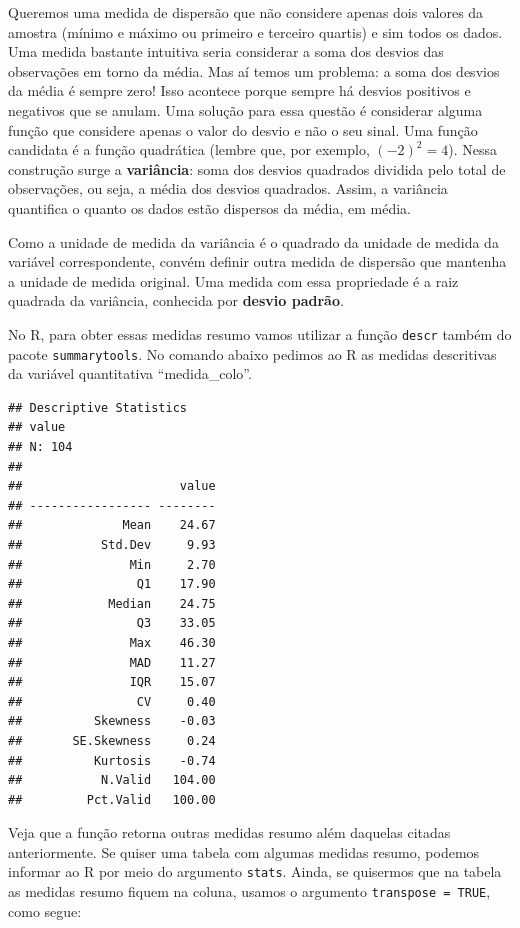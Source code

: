 \documentclass[
]{book}
\newenvironment{Shaded}{\begin{snugshade}}{\end{snugshade}}
\newcommand{\KeywordTok}[1]{\textcolor[rgb]{0.13,0.29,0.53}{\textbf{#1}}}
\newcommand{\NormalTok}[1]{#1}
\newcommand{\OperatorTok}[1]{\textcolor[rgb]{0.81,0.36,0.00}{\textbf{#1}}}
\begin{document}
Queremos uma medida de dispersão que não considere apenas dois valores da amostra (mínimo e máximo ou primeiro e terceiro quartis) e sim todos os dados. Uma medida bastante intuitiva seria considerar a soma dos desvios das observações em torno da média. Mas aí temos um problema: a soma dos desvios da média é sempre zero! Isso acontece porque sempre há desvios positivos e negativos que se anulam. Uma solução para essa questão é considerar alguma função que considere apenas o valor do desvio e não o seu sinal. Uma função candidata é a função quadrática (lembre que, por exemplo, \((-2)^2=4\)). Nessa construção surge a \textbf{variância}: soma dos desvios quadrados dividida pelo total de observações, ou seja, a média dos desvios quadrados. Assim, a variância quantifica o quanto os dados estão dispersos da média, em média.

Como a unidade de medida da variância é o quadrado da unidade de medida da variável correspondente, convém definir outra medida de dispersão que mantenha a unidade de medida original. Uma medida com essa propriedade é a raiz quadrada da variância, conhecida por \textbf{desvio padrão}.

No R, para obter essas medidas resumo vamos utilizar a função \texttt{descr} também do pacote \texttt{summarytools}. No comando abaixo pedimos ao R as medidas descritivas da variável quantitativa ``medida\_colo''.

\begin{Shaded}
\end{Shaded}

\begin{verbatim}
## Descriptive Statistics  
## value  
## N: 104  
## 
##                      value
## ----------------- --------
##              Mean    24.67
##           Std.Dev     9.93
##               Min     2.70
##                Q1    17.90
##            Median    24.75
##                Q3    33.05
##               Max    46.30
##               MAD    11.27
##               IQR    15.07
##                CV     0.40
##          Skewness    -0.03
##       SE.Skewness     0.24
##          Kurtosis    -0.74
##           N.Valid   104.00
##         Pct.Valid   100.00
\end{verbatim}

Veja que a função retorna outras medidas resumo além daquelas citadas anteriormente. Se quiser uma tabela com algumas medidas resumo, podemos informar ao R por meio do argumento \texttt{stats}. Ainda, se quisermos que na tabela as medidas resumo fiquem na coluna, usamos o argumento \texttt{transpose\ =\ TRUE}, como segue:
\end{document}
